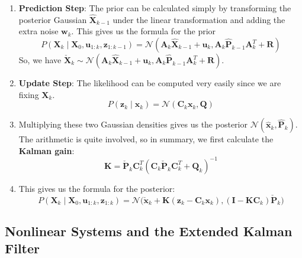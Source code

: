 \documentclass{article}
\begin{document}
  \begin{enumerate}
      \item \textbf{Prediction Step}: The prior can be calculated simply by transforming the posterior Gaussian $\hat{\mathbf{X}}_{k-1}$ under the linear transformation and adding the extra noise $\mathbf{w}_k$. This gives us the formula for the prior 
      \begin{equation}
        P(\mathbf{X}_k \mid \mathbf{X}_0, \mathbf{u}_{1:k}, \mathbf{z}_{1:k-1}) = \mathcal{N}(\mathbf{A}_k \hat{\mathbf{X}}_{k-1} + \mathbf{u}_k, \mathbf{A}_k \hat{\mathbf{P}}_{k-1} \mathbf{A}_k^T + \mathbf{R})
      \end{equation}
      So, we have $\check{\mathbf{X}}_{k} \sim \mathcal{N}(\mathbf{A}_k \hat{\mathbf{X}}_{k-1} + \mathbf{u}_k, \mathbf{A}_k \hat{\mathbf{P}}_{k-1} \mathbf{A}_k^T + \mathbf{R})$. 
      \item \textbf{Update Step}: The likelihood can be computed very easily since we are fixing $\mathbf{X}_k$. 
      \begin{equation}
        P(\mathbf{z}_k \mid \mathbf{x}_k) = \mathcal{N}(\mathbf{C}_k \mathbf{x}_k, \mathbf{Q})
      \end{equation}
      \item Multiplying these two Gaussian densities gives us the posterior $\mathcal{N}(\hat{\mathbf{x}}_k, \hat{\mathbf{P}}_k)$. The arithmetic is quite involved, so in summary, we first calculate the \textbf{Kalman gain}: 
      \begin{equation}
        \mathbf{K} = \check{\mathbf{P}}_k \mathbf{C}_k^T ( \mathbf{C}_k \check{\mathbf{P}}_k \mathbf{C}_k^T + \mathbf{Q}_k)^{-1}
      \end{equation}
      \item This gives us the formula for the posterior: 
      \begin{equation}
        P (\mathbf{X}_k \mid \mathbf{X}_0, \mathbf{u}_{1:k}, \mathbf{z}_{1:k}) = \mathcal{N} \big( \check{\mathbf{x}}_k + \mathbf{K}(\mathbf{z}_k - \mathbf{C}_k \mathbf{x}_k), (\mathbf{I} - \mathbf{K} \mathbf{C}_k ) \check{\mathbf{P}}_k \big)
      \end{equation}
  \end{enumerate}

  \subsection{Nonlinear Systems and the Extended Kalman Filter}
\end{document}
